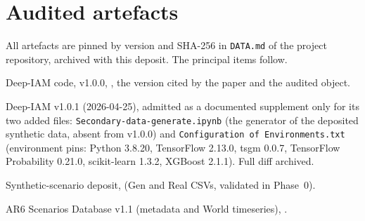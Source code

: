 \documentclass[11pt,a4paper]{article}
\newcommand{\prop}[1]{#1}
\newcommand{\prop}[1]{\textcolor{blue}{#1}}
\begin{document}
\section{Audited artefacts}\label{sec:artefacts}
All artefacts are pinned by version and SHA-256 in \texttt{DATA.md} of the
project repository, archived with this deposit. The principal items follow.
\begin{description}[nosep,font=\normalfont\bfseries,leftmargin=3.8em,labelwidth=3.4em,labelsep=0.4em,align=left]
\item[A1] Deep-IAM code, v1.0.0, , the
  version cited by the paper and the audited object.
\item[A2] Deep-IAM v1.0.1 (2026-04-25), admitted as a documented supplement
  only for its two added files: \texttt{Secondary-data-generate.ipynb} (the
  generator of the deposited synthetic data, absent from v1.0.0) and
  \texttt{Configuration of Environments.txt} (environment pins: Python
  3.8.20, TensorFlow 2.13.0, tsgm 0.0.7, \prop{TensorFlow Probability
  0.21.0,} scikit-learn 1.3.2, XGBoost 2.1.1). Full diff archived.
\item[A3] Synthetic-scenario deposit, 
  (Gen and Real CSVs, validated in Phase~0).
\item[B1--B2] AR6 Scenarios Database v1.1 (metadata and World
  timeseries), .
\end{description}
\end{document}
